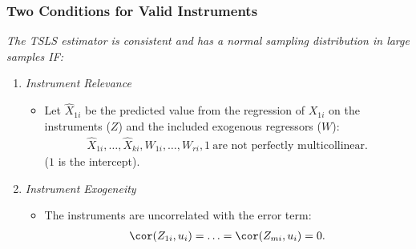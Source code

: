

\begin{frame}
\frametitle{Two Conditions for Valid Instruments}
\emph{The TSLS estimator is consistent and has a normal sampling distribution in large samples IF:}
\begin{enumerate}
\item \emph{Instrument Relevance}
\begin{itemize}
\item Let $\hat{X}_{1i}$ be the predicted value from the regression of $X_{1i}$ on the instruments ($Z$) and the included exogenous regressors ($W$): 
\begin{align*}
\hat{X}_{1i},\ldots,\hat{X}_{ki},W_{1i},\ldots,W_{ri},1 ~\text{are not perfectly multicollinear.}
\end{align*}
($1$ is the intercept). 
\end{itemize}
\item \emph{Instrument Exogeneity}
\begin{itemize}
\item The instruments are uncorrelated with the error term: 
\begin{align*}
\cor(Z_{1i},u_{i}) = \ldots = \cor(Z_{mi},u_{i}) = 0.
\end{align*}
\end{itemize}
\end{enumerate}
\end{frame}
